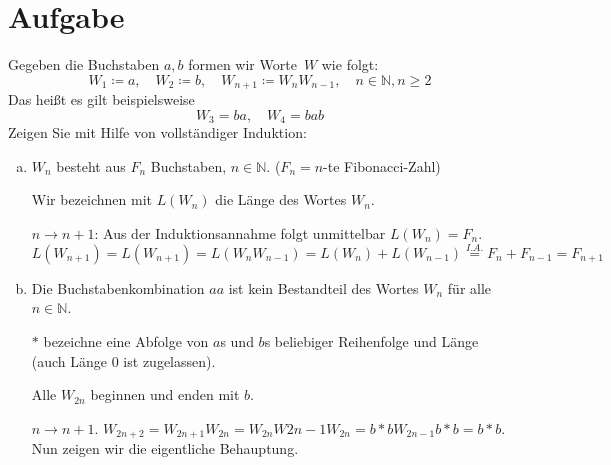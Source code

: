 \documentclass{article}
\begin{document}
\section{Aufgabe}
	Gegeben die Buchstaben $a,b$ formen wir \glqq Worte\grqq\ $W$ wie folgt:
	\[W_1\coloneqq a, \quad W_2\coloneqq b,\quad W_{n+1} \coloneqq W_nW_{n-1}, \quad n\in \mathbb{N}, n\geq 2\]
	Das heißt es gilt beispielsweise
	\[W_3 = ba, \quad W_4 = bab\]
	Zeigen Sie mit Hilfe von vollständiger Induktion:
	\begin{enumerate}[(a)]
		\item $W_n$ besteht aus $F_n$ Buchstaben, $n\in \mathbb{N}$. ($F_n = n$-te Fibonacci-Zahl)
		\begin{definition}
			Wir bezeichnen mit $L(W_n)$ die Länge des Wortes $W_n$.
		\end{definition}
		{$n\to n+1$: Aus der Induktionsannahme folgt unmittelbar $L(W_n) = F_n$. $L(W_{n+1}) = L(W_{n+1}) = L(W_{n}W_{n-1}) = L(W_n) + L(W_{n -1}) \overset{I.A.}{=} F_n + F_{n-1} = F_{n+1}$}
		\item Die Buchstabenkombination $aa$ ist kein Bestandteil des Wortes $W_n$ für alle $n\in \mathbb{N}$.
		\begin{definition}
			$*$ bezeichne eine Abfolge von $a$s und $b$s beliebiger Reihenfolge und Länge (auch Länge 0 ist zugelassen).
		\end{definition}
		\begin{lemma}
			Alle $W_{2n}$ beginnen und enden mit $b$.
		\end{lemma}
		{$n\to n+1$. $W_{2n+2} = W_{2n+1}W_{2n} = W_{2n}W{2n-1}W_{2n} = b*bW_{2n-1}b*b = b*b$.}
		Nun zeigen wir die eigentliche Behauptung.
	\end{enumerate}
\end{document}
